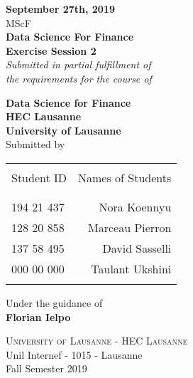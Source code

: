\begin{titlepage}

\begin{center}

\textup{\small {\bf September 27th, 2019} \\ MScF}\\[0.2in]

\Large \textbf {Data Science For Finance \\ Exercise Session 2}\\[0.5in]

       \small \emph{Submitted in partial fulfillment of\\
        the requirements for the course of}
        \vspace{.2in}

       {\bf Data Science for Finance \\ HEC Lausanne \\ University of Lausanne}\\[0.5in]

\normalsize Submitted by \\
\begin{table}[h]
\centering
\begin{tabular}{lr}\hline \\
Student ID & Names of Students \\ \\ \hline
\\
194 21 437 & Nora Koennyu \\
128 20 858 & Marceau Pierron \\
137 58 495 & David Sasselli \\ 
000 00 000 & Taulant Ukshini \\ \\ \hline 
\end{tabular}
\end{table}

\vspace{.1in}
Under the guidance of\\
{\textbf{Florian Ielpo}}\\[0.2in]

\vfill

\normalsize
\textsc{University of Lausanne - HEC Lausanne}\\
Unil Internef - 1015 - Lausanne \\
\vspace{0.2cm}
Fall Semester 2019

\end{center}

\end{titlepage}
